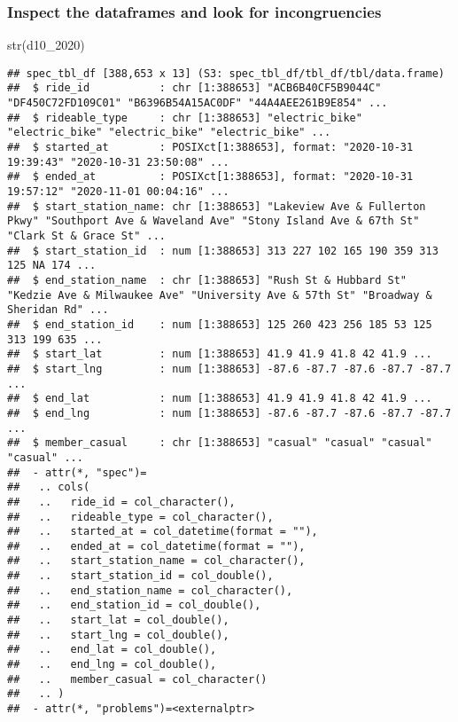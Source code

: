 \documentclass[
]{article}
\newenvironment{Shaded}{\begin{snugshade}}{\end{snugshade}}
\newcommand{\FunctionTok}[1]{\textcolor[rgb]{0.00,0.00,0.00}{#1}}
\newcommand{\NormalTok}[1]{#1}
\begin{document}
\hypertarget{inspect-the-dataframes-and-look-for-incongruencies}{%
\subsubsection{Inspect the dataframes and look for
incongruencies}\label{inspect-the-dataframes-and-look-for-incongruencies}}

\begin{Shaded}
\begin{Highlighting}[]
\FunctionTok{str}\NormalTok{(d10\_2020)}
\end{Highlighting}
\end{Shaded}

\begin{verbatim}
## spec_tbl_df [388,653 x 13] (S3: spec_tbl_df/tbl_df/tbl/data.frame)
##  $ ride_id           : chr [1:388653] "ACB6B40CF5B9044C" "DF450C72FD109C01" "B6396B54A15AC0DF" "44A4AEE261B9E854" ...
##  $ rideable_type     : chr [1:388653] "electric_bike" "electric_bike" "electric_bike" "electric_bike" ...
##  $ started_at        : POSIXct[1:388653], format: "2020-10-31 19:39:43" "2020-10-31 23:50:08" ...
##  $ ended_at          : POSIXct[1:388653], format: "2020-10-31 19:57:12" "2020-11-01 00:04:16" ...
##  $ start_station_name: chr [1:388653] "Lakeview Ave & Fullerton Pkwy" "Southport Ave & Waveland Ave" "Stony Island Ave & 67th St" "Clark St & Grace St" ...
##  $ start_station_id  : num [1:388653] 313 227 102 165 190 359 313 125 NA 174 ...
##  $ end_station_name  : chr [1:388653] "Rush St & Hubbard St" "Kedzie Ave & Milwaukee Ave" "University Ave & 57th St" "Broadway & Sheridan Rd" ...
##  $ end_station_id    : num [1:388653] 125 260 423 256 185 53 125 313 199 635 ...
##  $ start_lat         : num [1:388653] 41.9 41.9 41.8 42 41.9 ...
##  $ start_lng         : num [1:388653] -87.6 -87.7 -87.6 -87.7 -87.7 ...
##  $ end_lat           : num [1:388653] 41.9 41.9 41.8 42 41.9 ...
##  $ end_lng           : num [1:388653] -87.6 -87.7 -87.6 -87.7 -87.7 ...
##  $ member_casual     : chr [1:388653] "casual" "casual" "casual" "casual" ...
##  - attr(*, "spec")=
##   .. cols(
##   ..   ride_id = col_character(),
##   ..   rideable_type = col_character(),
##   ..   started_at = col_datetime(format = ""),
##   ..   ended_at = col_datetime(format = ""),
##   ..   start_station_name = col_character(),
##   ..   start_station_id = col_double(),
##   ..   end_station_name = col_character(),
##   ..   end_station_id = col_double(),
##   ..   start_lat = col_double(),
##   ..   start_lng = col_double(),
##   ..   end_lat = col_double(),
##   ..   end_lng = col_double(),
##   ..   member_casual = col_character()
##   .. )
##  - attr(*, "problems")=<externalptr>
\end{verbatim}
\end{document}
